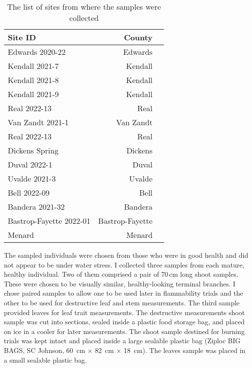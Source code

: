 \documentclass{ttuthes2007}
\begin{document}
\begin{table}
    \centering
    \begin{tabular}{lrr}
    \toprule
    Site ID & County\\
    \midrule
     Edwards 2020-22 & Edwards\\
     Kendall 2021-7    &  Kendall\\
     Kendall 2021-8   &  Kendall\\
     Kendall 2021-9   & Kendall\\
     Real 2022-13  & Real\\
     Van Zandt 2021-1 & Van Zandt\\
     Real 2022-13 & Real\\
     Dickens Spring & Dickens\\
     Duval 2022-1 & Duval\\
     Uvalde 2021-3 & Uvalde\\
     Bell 2022-09 & Bell\\
     Bandera 2021-32 & Bandera\\
     Bastrop-Fayette 2022-01 & Bastrop-Fayette\\
      Menard  & Menard\\
      \bottomrule
    \end{tabular}
    \caption{The list of sites from where the samples were collected}
    \label{tab:property list}
\end{table}





The sampled individuals were chosen from those who were in good health and did not appear to be under water stress. I collected three samples from each mature, healthy individual. Two of them comprised a pair of 70\,cm long shoot samples. These were chosen to be visually similar, healthy-looking terminal branches. I chose paired samples to allow one to be used later in flammability trials and the other to be used for destructive leaf and stem measurements. The third sample provided leaves for leaf trait measurements. %
The destructive measurements shoot sample was cut into sections, sealed inside a plastic food storage bag, and placed on ice in a cooler for later measurements. The shoot sample destined for burning trials was kept intact and placed inside a large sealable plastic bag (Ziploc BIG BAGS, SC Johnson, 60 \,cm × 82 \,cm × 18 \,cm). The leaves sample was placed in a small sealable plastic bag.
\end{document}
